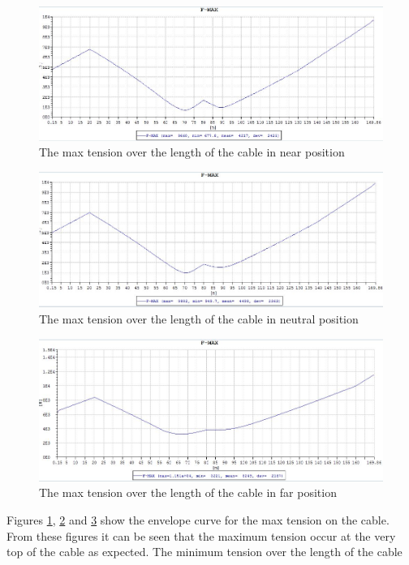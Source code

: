 \begin{figure}[H]
\centering
\includegraphics[scale=0.5]{figures/fmaxnear}
\caption[$\; \:$The max tension in near position]{The max tension over the length of the cable in near position}
 \label{fig:fmaxnear}
\end{figure}


\begin{figure}[H]
\centering
\includegraphics[scale=0.5]{figures/fmaxneu}
\caption[$\; \:$The max tension in neutral position]{The max tension over the length of the cable in neutral position}
 \label{fig:fmaxneu}
\end{figure}


\begin{figure}[H]
\centering
\includegraphics[scale=0.5]{figures/fmaxfar}
\caption[$\; \:$The max tension in far position]{The max tension over the length of the cable in far position}
 \label{fig:fmaxfar}
\end{figure}
\noindent Figures \ref{fig:fmaxnear}, \ref{fig:fmaxneu} and \ref{fig:fmaxfar} show the envelope curve for the max tension on the cable. From these figures it can be seen that the maximum tension occur at the very top of the cable as expected.\newline
 \newline 
 \noindent The minimum tension over the length of the cable
 
